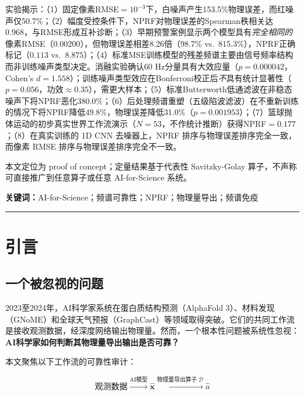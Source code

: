 \documentclass[9pt,twocolumn]{article}
\theoremstyle{remark}
\theoremstyle{definition}
\newcommand{\澔}{%
  \hbox{%
    \scalebox{0.75}[1]{氵}%
    \kern -0.3em%
    \scalebox{0.8}[1]{皓}%
  }%
}
\begin{document}
实验揭示：（1）固定像素RMSE$=10^{-3}$下，白噪声产生153.5\%物理误差，而红噪声仅50.7\%；（2）幅度受控条件下，NPRF对物理误差的Spearman秩相关达0.968，与RMSE形成互补诊断；（3）早期预警案例显示两个模型具有\textit{完全相同的}像素RMSE（$0.00200$），但物理误差相差8.26倍（98.7\% vs.\ 815.3\%），NPRF正确标记（$0.113$ vs.\ $8.875$）；（4）标准MSE训练模型的残差频谱主要由信号频率结构而非训练噪声类型决定。消融实验确认60 Hz分量具有大效应量（$p=0.000042$，Cohen's $d=1.558$）；训练噪声类型效应在Bonferroni校正后\textit{不}具有统计显著性（$p=0.056$，功效$\approx0.35$），需更大样本；（5）标准Butterworth低通滤波在非稳态噪声下将NPRF恶化380.0\%；（6）后处理频谱重塑（五级陷波滤波）在不重新训练的情况下将NPRF降低49.8\%，物理误差降低31.0\%（$p=0.001953$）；（7）篮球抛体运动的初步真实世界工作流演示（$N=53$，不作统计推断）获得NPRF$=0.177$；（8）在真实训练的 1D CNN 去噪器上，NPRF 排序与物理误差排序完全一致，而像素 RMSE 排序与物理误差排序完全不一致。

本文定位为 proof of concept；定量结果基于代表性 Savitzky-Golay 算子，不声称可直接推广到任意算子或任意 AI-for-Science 系统。

\vspace{2pt}
\noindent\textbf{关键词：}AI-for-Science；频谱可靠性；NPRF；物理量导出；频谱免疫

\endgroup

\vspace{2pt}
\hrule
\vspace{2pt}

\section{引言}

\subsection{一个被忽视的问题}

2023至2024年，AI科学家系统在蛋白质结构预测（AlphaFold 3\cite{abramson2024}）、材料发现（GNoME\cite{merchant2023}）和全球天气预报（GraphCast\cite{lam2023}）等领域取得突破。它们的共同工作流是接收观测数据，经深度网络输出物理量。然而，一个根本性问题被系统性忽视：\textbf{AI科学家如何判断其物理量导出输出是否可靠？}

本文聚焦以下工作流的可靠性审计：

\begin{equation}
\label{eq:workflow}
\text{观测数据} \xrightarrow{\text{AI模型}} \hat{\mathbf{x}} \xrightarrow{\text{物理量导出算子}\ \mathcal{D}} \hat{a}
\end{equation}
\end{document}
